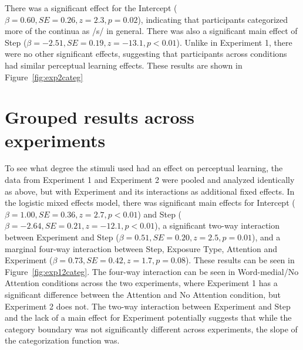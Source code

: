 There was a significant effect for the Intercept ($\beta = 0.60, SE = 0.26, z = 2.3, p = 0.02$), indicating that participants categorized more of the continua as /s/ in general. 
 There was also a significant main effect of Step ($\beta = -2.51, SE = 0.19, z = -13.1, p < 0.01$).  
Unlike in Experiment 1, there were no other significant effects, suggesting that participants across conditions had similar perceptual learning effects.
These results are shown in Figure~\ref{fig:exp2categ}

\section{Grouped results across experiments}

To see what degree the stimuli used had an effect on perceptual learning, the data from Experiment 1 and Experiment 2 were pooled and analyzed identically as above, but with Experiment and its interactions as additional fixed effects.  
In the logistic mixed effects model, there was significant main effects for Intercept ($\beta = 1.00, SE = 0.36, z = 2.7, p < 0.01$) and Step ($\beta = -2.64, SE = 0.21, z = -12.1, p < 0.01$), a significant two-way interaction between Experiment and Step ($\beta = 0.51, SE = 0.20, z = 2.5, p = 0.01$), and a marginal four-way interaction between Step, Exposure Type, Attention and Experiment ($\beta = 0.73, SE = 0.42, z = 1.7, p = 0.08$).  
These results can be seen in Figure~\ref{fig:exp12categ}.  
The four-way interaction can be seen in Word-medial/No Attention conditions across the two experiments, where Experiment 1 has a significant difference between the Attention and No Attention condition, but Experiment 2 does not.  
The two-way interaction between Experiment and Step and the lack of a main effect for Experiment potentially suggests that while the category boundary was not significantly different across experiments, the slope of the categorization function was.

